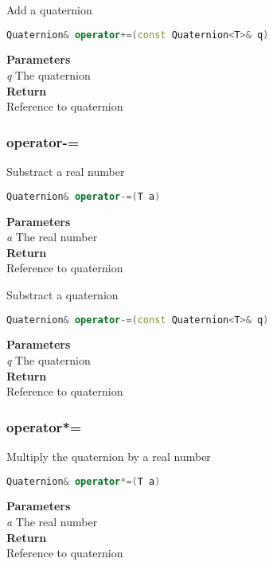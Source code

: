 \begin{mdframed}
Add a quaternion
\begin{lstlisting}[language=C++]
Quaternion& operator+=(const Quaternion<T>& q)
\end{lstlisting}
\textbf{Parameters} \\ 
\textit{q} The quaternion \\ 
\textbf{Return} \\ 
Reference to quaternion\\ 
\end{mdframed}

\subsubsection{operator-=}
\begin{mdframed}
Substract a real number
\begin{lstlisting}[language=C++]
Quaternion& operator-=(T a)
\end{lstlisting}
\textbf{Parameters} \\ 
\textit{a} The real number \\ 
\textbf{Return} \\ 
Reference to quaternion\\ 
\end{mdframed}

\begin{mdframed}
Substract a quaternion
\begin{lstlisting}[language=C++]
Quaternion& operator-=(const Quaternion<T>& q)
\end{lstlisting}
\textbf{Parameters} \\ 
\textit{q} The quaternion \\ 
\textbf{Return} \\ 
Reference to quaternion\\ 
\end{mdframed}

\subsubsection{operator*=}
\begin{mdframed}
Multiply the quaternion by a real number
\begin{lstlisting}[language=C++]
Quaternion& operator*=(T a)
\end{lstlisting}
\textbf{Parameters} \\ 
\textit{a} The real number \\ 
\textbf{Return} \\ 
Reference to quaternion\\ 
\end{mdframed}

